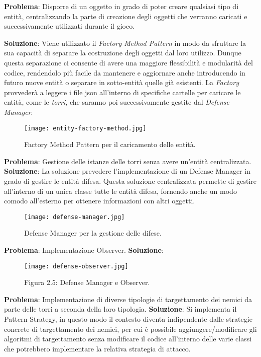 \documentclass[a4paper,12pt]{report}
\begin{document}
\vspace{15mm}

\textbf{Problema}:
Disporre di un oggetto in grado di poter creare qualsiasi tipo di entità, centralizzando la parte di creazione degli oggetti che verranno caricati e successivamente utilizzati
durante il gioco.

\textbf{Soluzione}:
Viene utilizzato il \textit{Factory Method Pattern} in modo da sfruttare la sua capacità di separare la costruzione degli oggetti dal loro utilizzo. Dunque questa separazione ci consente di avere una maggiore flessibilità e modularità del codice, rendendolo più facile da mantenere e aggiornare anche introducendo in futuro nuove entità o separare in sotto-entità quelle già esistenti. 
La \textit{Factory} provvederà a leggere i file json all'interno di specifiche cartelle per caricare
le entità, come le \textit{torri}, che saranno poi successivamente gestite dal \textit{Defense Manager}.
\begin{figure}[H]
    \centering
    \texttt{[image: entity-factory-method.jpg]}
    \caption{Factory Method Pattern per il caricamento delle entità.}
    \label{fig:entity-factory-method}
\end{figure}
\vspace{25mm}
\textbf{Problema}:
Gestione delle istanze delle torri senza avere un'entità centralizzata.
\textbf{Soluzione}:
La soluzione prevedere l'implementazione di un Defense Manager in grado di gestire le entità difesa. Questa soluzione centralizzata permette di gestire all'interno di un unica classe tutte le entità difesa, fornendo anche un modo comodo all'esterno per ottenere informazioni con altri oggetti.

\begin{figure}[H]
    \centering
    \texttt{[image: defense-manager.jpg]}
    \caption{Defense Manager per la gestione delle difese.}
    \label{fig:defense-manager}
\end{figure}

\vspace{50mm}
\textbf{Problema}:
Implementazione Observer.
\textbf{Soluzione}:


\begin{figure}[H]
    \centering
    \texttt{[image: defense-observer.jpg]}
    \caption{Figura 2.5: Defense Manager e Observer.}
    \label{fig:defense-observer}
\end{figure}
\vspace{50mm}
\textbf{Problema}:
Implementazione di diverse tipologie di targettamento dei nemici da parte delle torri a seconda della loro tipologia.
\textbf{Soluzione}:
Si implementa il Pattern Strategy, in questo modo il contesto diventa indipendente dalle strategie concrete di targettamento dei nemici, per cui è possibile aggiungere/modificare gli algoritmi di targettamento senza modificare il codice all'interno delle varie classi che potrebbero implementare la relativa strategia di attacco.
\end{document}
